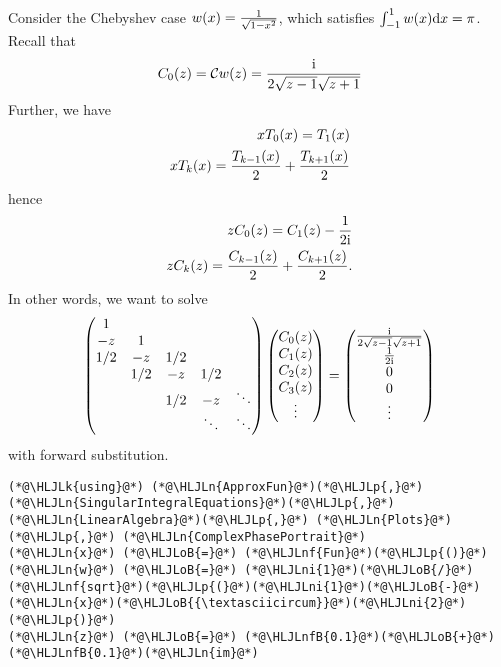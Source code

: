 \documentclass[12pt,landscape]{article}
\newcommand{\HLJLk}[1]{\textcolor[RGB]{148,91,176}{\textbf{#1}}}
\newcommand{\HLJLn}[1]{#1}
\newcommand{\HLJLnf}[1]{\textcolor[RGB]{66,102,213}{#1}}
\newcommand{\HLJLnfB}[1]{\textcolor[RGB]{59,151,46}{#1}}
\newcommand{\HLJLni}[1]{\textcolor[RGB]{59,151,46}{#1}}
\newcommand{\HLJLoB}[1]{\textcolor[RGB]{102,102,102}{\textbf{#1}}}
\newcommand{\HLJLp}[1]{#1}
\def\D{ {\rm d} }
\def\I{ {\rm i} }
\def\C{ {\mathbb C} }
\def\dx{\D x}
\begin{document}
{Consider the Chebyshev case $w(x) = {1 \over \sqrt{1-x^2}}$, which satisfies $\int_{-1}^1 w(x) \dx = {\pi}$. Recall that
\[
    C_0(z) ={\cal C}w(z) = { \I \over 2\sqrt{z-1}\sqrt{z+1}}
\]
Further, we have
\begin{align*}
x T_0(x) = T_1(x) \\
x T_k(x) = {T_{k-1}(x) \over 2} + { T_{k+1}(x) \over 2}
\end{align*}
hence
\begin{align*}
z C_0(z) = C_1(z) -  {1  \over 2 \I} \\
z C_k(z) = {C_{k-1}(z) \over 2} +{C_{k+1}(z) \over 2} .
\end{align*}
In other words, we want to solve
\[
\begin{pmatrix}
1 \\
-z & 1 \\
1/2 & -z & 1/2 \\
&1/2 & -z & 1/2 \\
&& 1/2 & -z &\ddots\\
&&&\ddots & \ddots
\end{pmatrix}\begin{pmatrix}C_0(z) \\C_1(z) \\C_2(z) \\C_3(z) \\ \vdots \end{pmatrix} = \begin{pmatrix} { \I \over 2\sqrt{z-1}\sqrt{z+1}} \\{1 \over 2 \I} \\0 \\0 \\ \vdots \end{pmatrix}
\]
with forward substitution.
\begin{lstlisting}
(*@\HLJLk{using}@*) (*@\HLJLn{ApproxFun}@*)(*@\HLJLp{,}@*) (*@\HLJLn{SingularIntegralEquations}@*)(*@\HLJLp{,}@*) (*@\HLJLn{LinearAlgebra}@*)(*@\HLJLp{,}@*) (*@\HLJLn{Plots}@*)(*@\HLJLp{,}@*) (*@\HLJLn{ComplexPhasePortrait}@*)
(*@\HLJLn{x}@*) (*@\HLJLoB{=}@*) (*@\HLJLnf{Fun}@*)(*@\HLJLp{()}@*)
(*@\HLJLn{w}@*) (*@\HLJLoB{=}@*) (*@\HLJLni{1}@*)(*@\HLJLoB{/}@*)(*@\HLJLnf{sqrt}@*)(*@\HLJLp{(}@*)(*@\HLJLni{1}@*)(*@\HLJLoB{-}@*)(*@\HLJLn{x}@*)(*@\HLJLoB{{\textasciicircum}}@*)(*@\HLJLni{2}@*)(*@\HLJLp{)}@*)
(*@\HLJLn{z}@*) (*@\HLJLoB{=}@*) (*@\HLJLnfB{0.1}@*)(*@\HLJLoB{+}@*)(*@\HLJLnfB{0.1}@*)(*@\HLJLn{im}@*)


\end{lstlisting}}
\end{document}
